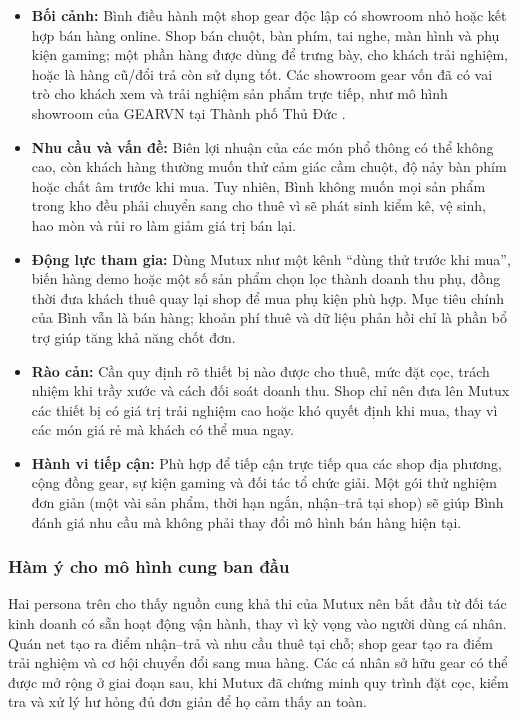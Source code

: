 \begin{itemize}
    \item \textbf{Bối cảnh:} Bình điều hành một shop gear độc lập có showroom nhỏ hoặc kết hợp bán hàng online. Shop bán chuột, bàn phím, tai nghe, màn hình và phụ kiện gaming; một phần hàng được dùng để trưng bày, cho khách trải nghiệm, hoặc là hàng cũ/đổi trả còn sử dụng tốt. Các showroom gear vốn đã có vai trò cho khách xem và trải nghiệm sản phẩm trực tiếp, như mô hình showroom của GEARVN tại Thành phố Thủ Đức \cite{gearvnShowroom}.
    \item \textbf{Nhu cầu và vấn đề:} Biên lợi nhuận của các món phổ thông có thể không cao, còn khách hàng thường muốn thử cảm giác cầm chuột, độ nảy bàn phím hoặc chất âm trước khi mua. Tuy nhiên, Bình không muốn mọi sản phẩm trong kho đều phải chuyển sang cho thuê vì sẽ phát sinh kiểm kê, vệ sinh, hao mòn và rủi ro làm giảm giá trị bán lại.
    \item \textbf{Động lực tham gia:} Dùng Mutux như một kênh ``dùng thử trước khi mua'', biến hàng demo hoặc một số sản phẩm chọn lọc thành doanh thu phụ, đồng thời đưa khách thuê quay lại shop để mua phụ kiện phù hợp. Mục tiêu chính của Bình vẫn là bán hàng; khoản phí thuê và dữ liệu phản hồi chỉ là phần bổ trợ giúp tăng khả năng chốt đơn.
    \item \textbf{Rào cản:} Cần quy định rõ thiết bị nào được cho thuê, mức đặt cọc, trách nhiệm khi trầy xước và cách đối soát doanh thu. Shop chỉ nên đưa lên Mutux các thiết bị có giá trị trải nghiệm cao hoặc khó quyết định khi mua, thay vì các món giá rẻ mà khách có thể mua ngay.
    \item \textbf{Hành vi tiếp cận:} Phù hợp để tiếp cận trực tiếp qua các shop địa phương, cộng đồng gear, sự kiện gaming và đối tác tổ chức giải. Một gói thử nghiệm đơn giản (một vài sản phẩm, thời hạn ngắn, nhận--trả tại shop) sẽ giúp Bình đánh giá nhu cầu mà không phải thay đổi mô hình bán hàng hiện tại.
\end{itemize}

\subsubsection{Hàm ý cho mô hình cung ban đầu}

Hai persona trên cho thấy nguồn cung khả thi của Mutux nên bắt đầu từ đối tác kinh doanh có sẵn hoạt động vận hành, thay vì kỳ vọng vào người dùng cá nhân. Quán net tạo ra điểm nhận--trả và nhu cầu thuê tại chỗ; shop gear tạo ra điểm trải nghiệm và cơ hội chuyển đổi sang mua hàng. Các cá nhân sở hữu gear có thể được mở rộng ở giai đoạn sau, khi Mutux đã chứng minh quy trình đặt cọc, kiểm tra và xử lý hư hỏng đủ đơn giản để họ cảm thấy an toàn.
